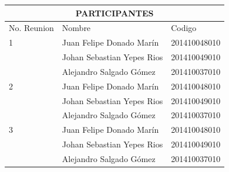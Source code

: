 \documentclass{article}
\begin{document}
    \begin{tabularx}{\textwidth}{ |X|X|X| }
        \hline
        \multicolumn{3}{|c|}{\cellcolor{blue} PARTICIPANTES} \\
        \hline
        No. Reunion & Nombre & Codigo \\
        \hline
        1 & Juan Felipe Donado Mar\'in & 201410048010 \\
         & Johan Sebastian Yepes Rios & 201410049010 \\
         & Alejandro Salgado G\'omez & 201410037010 \\ 
        \hline
        2 & Juan Felipe Donado Mar\'in & 201410048010 \\
         & Johan Sebastian Yepes Rios & 201410049010 \\
         & Alejandro Salgado G\'omez & 201410037010 \\ 
        \hline
        3 & Juan Felipe Donado Mar\'in & 201410048010 \\
         & Johan Sebastian Yepes Rios & 201410049010 \\
         & Alejandro Salgado G\'omez & 201410037010 \\ 
        \hline

    \end{tabularx}

    \vspace{1cm}
\end{document}
